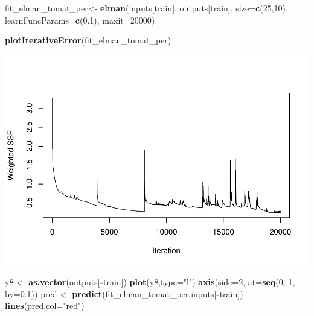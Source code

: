 \documentclass[
]{book}
\newenvironment{Shaded}{\begin{snugshade}}{\end{snugshade}}
\newcommand{\AttributeTok}[1]{\textcolor[rgb]{0.13,0.29,0.53}{#1}}
\newcommand{\DecValTok}[1]{\textcolor[rgb]{0.00,0.00,0.81}{#1}}
\newcommand{\FloatTok}[1]{\textcolor[rgb]{0.00,0.00,0.81}{#1}}
\newcommand{\FunctionTok}[1]{\textcolor[rgb]{0.13,0.29,0.53}{\textbf{#1}}}
\newcommand{\NormalTok}[1]{#1}
\newcommand{\OtherTok}[1]{\textcolor[rgb]{0.56,0.35,0.01}{#1}}
\newcommand{\SpecialCharTok}[1]{\textcolor[rgb]{0.81,0.36,0.00}{\textbf{#1}}}
\newcommand{\StringTok}[1]{\textcolor[rgb]{0.31,0.60,0.02}{#1}}
\begin{document}
\begin{Shaded}
\begin{Highlighting}[]
\NormalTok{fit\_elman\_tomat\_per}\OtherTok{\textless{}{-}} \FunctionTok{elman}\NormalTok{(inputs[train],}
\NormalTok{                       outputs[train],}
                       \AttributeTok{size=}\FunctionTok{c}\NormalTok{(}\DecValTok{25}\NormalTok{,}\DecValTok{10}\NormalTok{),}
                       \AttributeTok{learnFuncParams=}\FunctionTok{c}\NormalTok{(}\FloatTok{0.1}\NormalTok{),}
                       \AttributeTok{maxit=}\DecValTok{20000}\NormalTok{)}


\FunctionTok{plotIterativeError}\NormalTok{(fit\_elman\_tomat\_per)}
\end{Highlighting}
\end{Shaded}

\includegraphics{bookdown-demo_files/figure-latex/unnamed-chunk-202-1.pdf}

\begin{Shaded}
\begin{Highlighting}[]
\NormalTok{y8 }\OtherTok{\textless{}{-}} \FunctionTok{as.vector}\NormalTok{(outputs[}\SpecialCharTok{{-}}\NormalTok{train])}
\FunctionTok{plot}\NormalTok{(y8,}\AttributeTok{type=}\StringTok{"l"}\NormalTok{)}
\FunctionTok{axis}\NormalTok{(}\AttributeTok{side=}\DecValTok{2}\NormalTok{, }\AttributeTok{at=}\FunctionTok{seq}\NormalTok{(}\DecValTok{0}\NormalTok{, }\DecValTok{1}\NormalTok{, }\AttributeTok{by=}\FloatTok{0.1}\NormalTok{))}
\NormalTok{pred }\OtherTok{\textless{}{-}} \FunctionTok{predict}\NormalTok{(fit\_elman\_tomat\_per,inputs[}\SpecialCharTok{{-}}\NormalTok{train])}
\FunctionTok{lines}\NormalTok{(pred,}\AttributeTok{col=}\StringTok{"red"}\NormalTok{)}
\end{Highlighting}
\end{Shaded}
\end{document}
